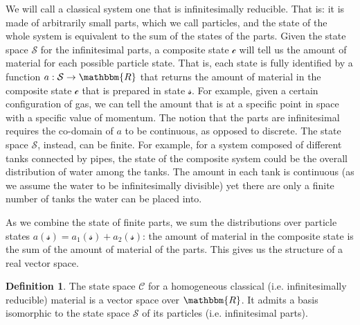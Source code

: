 \documentclass[aps,pra,10pt,twocolumn,floatfix,nofootinbib]{revtex4-1}
\theoremstyle{definition}
\newtheorem{defn}[prop]{Definition}
\begin{document}
We will call a classical system one that is infinitesimally reducible. That is: it is made of arbitrarily small parts, which we call particles, and the state of the whole system is equivalent to the sum of the states of the parts. Given the state space $\mathcal{S}$ for the infinitesimal parts, a composite state $\mathcal{c}$ will tell us the amount of material for each possible particle state. That is, each state is fully identified by a function $a: \mathcal{S} \to \mathbbm{R}$ that returns the amount of material in the composite state $\mathcal{c}$ that is prepared in state $\mathcal{s}$. For example, given a certain configuration of gas, we can tell the amount that is at a specific point in space with a specific value of momentum. The notion that the parts are infinitesimal requires the co-domain of $a$ to be continuous, as opposed to discrete. The state space $\mathcal{S}$, instead, can be finite. For example, for a system composed of different tanks connected by pipes, the state of the composite system could be the overall distribution of water among the tanks. The amount in each tank is continuous (as we assume the water to be infinitesimally divisible) yet there are only a finite number of tanks the water can be placed into.

As we combine the state of finite parts, we sum the distributions over particle states $a(\mathcal{s})=a_1(\mathcal{s})+a_2(\mathcal{s})$: the amount of material in the composite state is the sum of the amount of material of the parts. This gives us the structure of a real vector space.

\begin{defn}\label{classical_vector space}
The state space $\mathcal{C}$ for a homogeneous classical (i.e. infinitesimally reducible) material is a vector space over $\mathbbm{R}$. It admits a basis isomorphic to the state space $\mathcal{S}$ of its particles (i.e. infinitesimal parts).
\end{defn}
\end{document}
